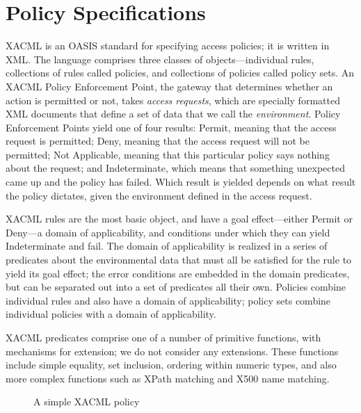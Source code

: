 \section{Policy Specifications}
\label{sec:policy-spec}

XACML is an OASIS standard for specifying access policies; it is
written in XML.  The language comprises three classes of
objects---individual rules, collections of rules called policies, and
collections of policies called policy sets.  An XACML Policy
Enforcement Point, the gateway that determines whether an action is
permitted or not, takes \emph{access requests}, which are specially
formatted XML documents that define a set of data that we call the
\emph{environment}.  Policy Enforcement Points yield one of four
results: Permit, meaning that the access request is permitted; Deny,
meaning that the access request will not be permitted; Not Applicable,
meaning that this particular policy says nothing about the request;
and Indeterminate, which means that something unexpected came up and
the policy has failed.  Which result is yielded depends on what result
the policy dictates, given the environment defined in the access
request.

XACML rules are the most basic object, and have a goal effect---either
Permit or Deny---a domain of applicability, and conditions under which
they can yield Indeterminate and fail.  The domain of applicability is
realized in a series of predicates about the environmental data that
must all be satisfied for the rule to yield its goal effect; the error
conditions are embedded in the domain predicates, but can be separated
out into a set of predicates all their own.  Policies combine
individual rules and also have a domain of applicability; policy sets
combine individual policies with a domain of applicability.

XACML predicates comprise one of a number of primitive functions, with
mechanisms for extension; we do not consider any extensions.  These
functions include simple equality, set inclusion, ordering within
numeric types, and also more complex functions such as XPath matching
and X500 name matching.

\begin{figure}[t]
\centering
\begin{scriptsize}
 
\end{scriptsize}
\caption{A simple XACML policy}
\label{fig:example}
\end{figure}

